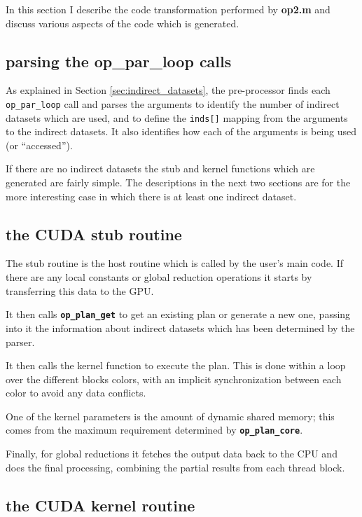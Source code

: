 \documentclass[12pt]{article}
\begin{document}
In this section I describe the code transformation performed by
{\bf op2.m} and discuss various aspects of the code which is generated.

\subsection{parsing the op\_par\_loop calls}

As explained in Section \ref{sec:indirect_datasets}, the pre-processor
finds each {\tt op\_par\_loop} call
and parses the arguments to identify the number of indirect
datasets which are used, and to define the {\tt inds[]} mapping
from the arguments to the indirect datasets.  It also identifies
how each of the arguments is being used (or ``accessed'').

If there are no indirect datasets the stub and kernel functions
which are generated are fairly simple.  The descriptions in the next
two sections are for the more interesting case in which there is
at least one indirect dataset.

\subsection{the CUDA stub routine}

The stub routine is the host routine which is called by the user's
main code.  If there are any local constants or global reduction
operations it starts by transferring this data to the GPU.

It then calls {\tt \bf op\_plan\_get} to get an existing plan or
generate a new one, passing into it the information about indirect
datasets which has been determined by the parser.

It then calls the kernel function to execute the plan.  This is
done within a loop over the different blocks colors, with an
implicit synchronization between each color to avoid any data
conflicts.

One of the kernel parameters is the amount of dynamic shared
memory; this comes from the maximum requirement determined
by {\tt \bf op\_plan\_core}.

Finally, for global reductions it fetches the output data back
to the CPU and does the final processing, combining the partial
results from each thread block.


\subsection{the CUDA kernel routine}
\end{document}
